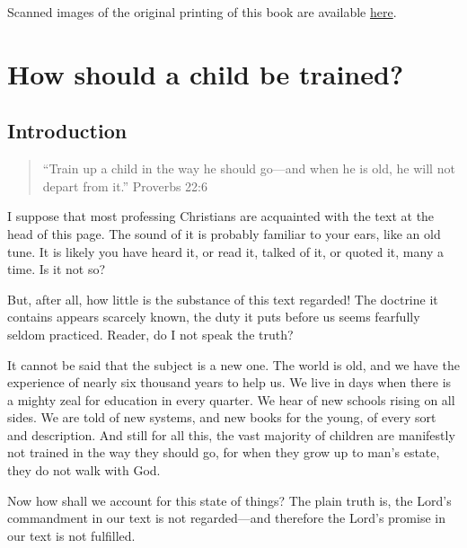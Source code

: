 \documentclass[
]{book}
\begin{document}
Scanned images of the original printing of this book are available \href{https://www.google.com/books/edition/Wheat_Or_Chaff/il5QAQAAMAAJ?hl=en\&gbpv=1\&pg=PA219\&printsec=frontcover}{here}.

\clearpage
\setcounter{page}{1}

\hypertarget{how-should-a-child-be-trained}{%
\chapter*{How should a child be trained?}\label{how-should-a-child-be-trained}}

\hypertarget{introduction}{%
\section*{Introduction}\label{introduction}}

\begin{quote}
``Train up a child in the way he should go---and when he is old, he will not depart from it.'' Proverbs 22:6
\end{quote}

I suppose that most professing Christians are acquainted with the text at the head of this page. The sound of it is probably familiar to your ears, like an old tune. It is likely you have heard it, or read it, talked of it, or quoted it, many a time. Is it not so?

But, after all, how little is the substance of this text regarded! The doctrine it contains appears scarcely known, the duty it puts before us seems fearfully seldom practiced. Reader, do I not speak the truth?

It cannot be said that the subject is a new one. The world is old, and we have the experience of nearly six thousand years to help us. We live in days when there is a mighty zeal for education in every quarter. We hear of new schools rising on all sides. We are told of new systems, and new books for the young, of every sort and description. And still for all this, the vast majority of children are manifestly not trained in the way they should go, for when they grow up to man's estate, they do not walk with God.

Now how shall we account for this state of things? The plain truth is, the Lord's commandment in our text is not regarded---and therefore the Lord's promise in our text is not fulfilled.
\end{document}
